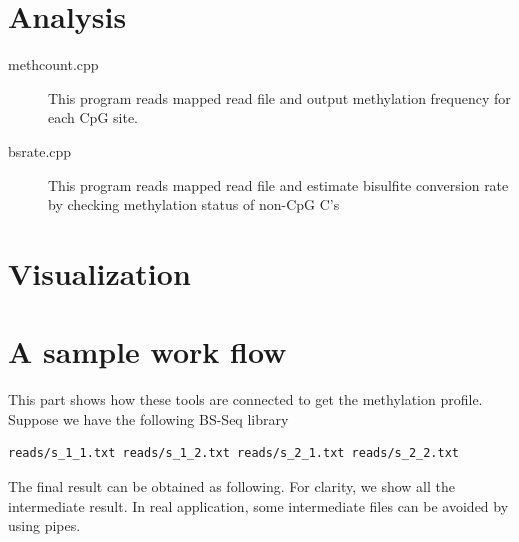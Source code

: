 \documentclass{article}
\begin{document}
\section{Analysis}
\label{sec:analysis}

\begin{description}
\item[methcount.cpp]
This program reads mapped read file and output methylation frequency
for each CpG site.

\item[bsrate.cpp]
This program reads mapped read file and estimate bisulfite conversion
rate by checking methylation status of non-CpG C's

\end{description}

\section{Visualization}
\label{sec:visualization}




\section{A sample work flow}
This part shows how these tools are connected to get the methylation
profile. Suppose we have the following BS-Seq library
\begin{verbatim}
reads/s_1_1.txt reads/s_1_2.txt reads/s_2_1.txt reads/s_2_2.txt
\end{verbatim}

The final result can be obtained as following. For clarity, we show
all the intermediate result. In real application, some intermediate
files can be avoided by using pipes.
\end{document}
